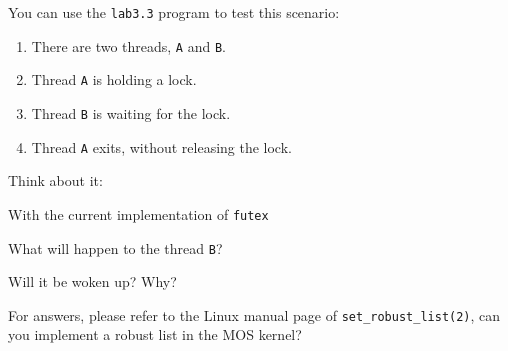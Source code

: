 You can use the \texttt{lab3.3} program to test this scenario:

\begin{enumerate}
    \item There are two threads, \texttt{A} and \texttt{B}.
    \item Thread \texttt{A} is holding a lock.
    \item Thread \texttt{B} is waiting for the lock.
    \item Thread \texttt{A} exits, without releasing the lock.
\end{enumerate}


\begin{exercise*}{Think about it:}
    \item With the current implementation of \texttt{futex}
    \item What will happen to the thread \texttt{B}?
    \item Will it be woken up? Why?
\end{exercise*}


\noindent
For answers, please refer to the Linux manual page of \texttt{set\_robust\_list(2)}, can you
implement a robust list in the MOS kernel?
